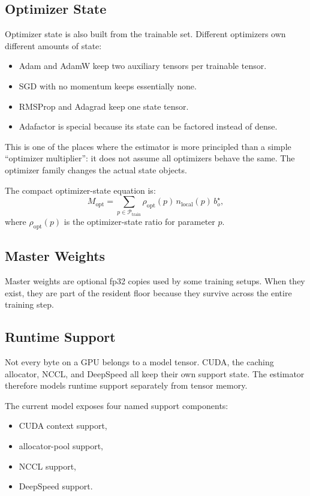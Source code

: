 \subsection{Optimizer State}
Optimizer state is also built from the trainable set. Different optimizers own
different amounts of state:
\begin{itemize}[leftmargin=1.5em]
\item Adam and AdamW keep two auxiliary tensors per trainable tensor.
\item SGD with no momentum keeps essentially none.
\item RMSProp and Adagrad keep one state tensor.
\item Adafactor is special because its state can be factored instead of dense.
\end{itemize}

This is one of the places where the estimator is more principled than a simple
``optimizer multiplier'': it does not assume all optimizers behave the same.
The optimizer family changes the actual state objects.

The compact optimizer-state equation is:
\[
M_{\mathrm{opt}} =
\sum_{p \in \mathcal{P}_{\mathrm{train}}}
\rho_{\mathrm{opt}}(p)\, n_{\mathrm{local}}(p)\, b_o^\star,
\]
where $\rho_{\mathrm{opt}}(p)$ is the optimizer-state ratio for parameter $p$.

\subsection{Master Weights}
Master weights are optional fp32 copies used by some training setups. When they
exist, they are part of the resident floor because they survive across the
entire training step.

\subsection{Runtime Support}
Not every byte on a GPU belongs to a model tensor. CUDA, the caching allocator,
NCCL, and DeepSpeed all keep their own support state. The estimator therefore
models runtime support separately from tensor memory.

The current model exposes four named support components:
\begin{itemize}[leftmargin=1.5em]
\item CUDA context support,
\item allocator-pool support,
\item NCCL support,
\item DeepSpeed support.
\end{itemize}

